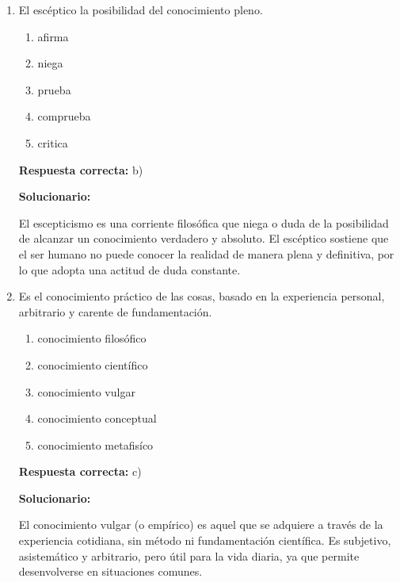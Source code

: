 \begin{enumerate}[resume]
 El reforzamiento positivo consiste en presentar un estímulo agradable (ir al cine) para incrementar una conducta deseada (hacer la tarea).
 Rebeca motiva a su hijo ofreciéndole una recompensa, lo cual aumenta la probabilidad de que cumpla con la tarea.



	\item El escéptico \underline{\hspace{1.5cm}} la posibilidad del conocimiento pleno.

	\begin{enumerate}[label=\alph*)]
		\item afirma
		\item niega
		\item prueba
		\item comprueba
		\item critica
	\end{enumerate}

	\textbf{Respuesta correcta:} b)


	\vspace{2mm}
	\textbf{Solucionario:}

	El escepticismo es una corriente filosófica que niega o duda de la posibilidad de alcanzar un conocimiento verdadero y absoluto.
	El escéptico sostiene que el ser humano no puede conocer la realidad de manera plena y definitiva, por lo que adopta una actitud de duda constante.


	\vspace{6mm}

	\item Es el conocimiento práctico de las cosas, basado en la experiencia personal, arbitrario y carente de fundamentación.
	\begin{enumerate}[label=\alph*)]
		\item conocimiento filosófico
		\item conocimiento científico
		\item conocimiento vulgar
		\item conocimiento conceptual
		\item conocimiento metafisíco
	\end{enumerate}

	\textbf{Respuesta correcta:} c)


		\vspace{2mm}
		\textbf{Solucionario:}

		El conocimiento vulgar (o empírico) es aquel que se adquiere a través de la experiencia cotidiana, sin método ni fundamentación científica.
		Es subjetivo, asistemático y arbitrario, pero útil para la vida diaria, ya que permite desenvolverse en situaciones comunes.


	\vspace{6mm}

\end{enumerate}





